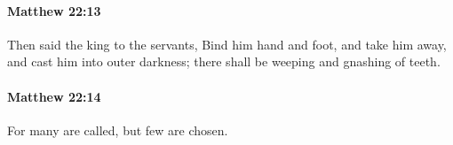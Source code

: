 		\paragraph{Matthew 22:13} %
			\label{MATTHEW-22-13}

			Then said the king to the servants, Bind him hand and foot, and take him away, and cast him into outer darkness; there shall be weeping and gnashing of teeth.

			\begin{framed}
			\scriptsize
				\begin{compactdesc}
					\item[SBLG] 
				\end{compactdesc}
			\end{framed}

		\paragraph{Matthew 22:14} %
			\label{MATTHEW-22-14}

			For many are called, but few are chosen.

			\begin{framed}
			\scriptsize
				\begin{compactdesc}
					\item[SBLG]  \hyperref[EKLEKTOS]{\grl{ἐκλεκτοί}}\gr{.}
				\end{compactdesc}
			\end{framed}

